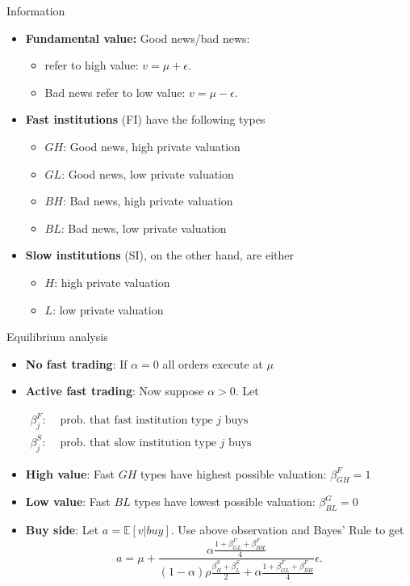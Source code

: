 \documentclass[english,10pt
,aspectratio=169
]{beamer}
\begin{document}
\begin{frame}{Information}
	\begin{itemize}
		\item \textbf{Fundamental value:} Good news/bad news:
		\begin{itemize}
			\item {} refer to high value: $v=\mu+\epsilon$.
			\item \alert{Bad news} refer to low value: $v=\mu-\epsilon$.
		\end{itemize}
		\item \textbf{Fast institutions} (FI) have the following types
		\begin{itemize}
			\item $GH$: Good news, high private valuation
			\item $GL$: Good news, low private valuation
			\item $BH$: Bad news, high private valuation
			\item $BL$: Bad news, low private valuation
		\end{itemize}
		\item \textbf{Slow institutions} (SI), on the other hand, are either
		\begin{itemize}
			\item $H$: high private valuation
			\item $L$: low private valuation
		\end{itemize}
	\end{itemize}
\end{frame}


\begin{frame}{Equilibrium analysis}
	\begin{itemize}
		\item \textbf{No fast trading}: If $\alpha=0$ all orders execute at $\mu$
		\item \textbf{Active fast trading}: Now suppose $\alpha>0$. Let
		\smallskip
		\begin{center}
			$
			\displaystyle
			\begin{aligned}
			\beta^{F}_{j}: & \text{ prob. that fast institution type $j$ buys} \\ 
			\beta^{S}_{j}: & \text{ prob. that slow institution type $j$ buys} 
			\end{aligned}
			$
		\end{center}
		\item \textbf{High value}: Fast $GH$ types have highest possible valuation: $\beta^{F}_{GH}=1$
		\item \textbf{Low value}: Fast $BL$ types have lowest possible valuation: $\beta^{G}_{BL}=0$
		\item \textbf{Buy side}: Let $a  =\mathbb{E}[v|buy]$. Use above observation and Bayes' Rule to get
		\[a =\mu+\frac{\alpha\frac{1+\beta^{F}_{GL}+\beta^{F}_{BH}}{4}}{(1-\alpha)\rho\frac{\beta^{S}_{H}+\beta^{S}_{L}}{2}+\alpha\frac{1+\beta^{F}_{GL}+\beta^{F}_{BH}}{4}} \epsilon.
		\]
	\end{itemize}
\end{frame}
\end{document}
